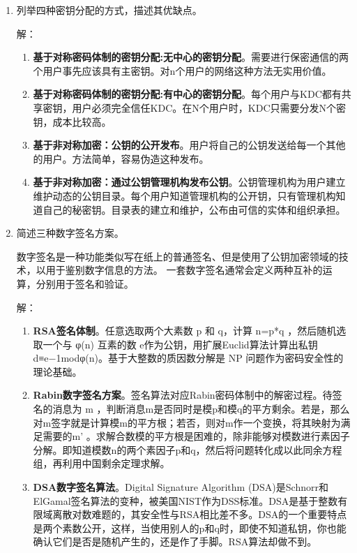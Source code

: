 \documentclass[degree=project,degree-type=project,cjk-font=noto]{thuthesis}
\begin{document}
\begin{enumerate}
\item 列举四种密钥分配的方式，描述其优缺点。

  {\heiti 解：}

\begin{enumerate}
  \item \textbf{基于对称密码体制的密钥分配:无中心的密钥分配}。需要进行保密通信的两个用户事先应该具有主密钥。对n个用户的网络这种方法无实用价值。
  \item \textbf{基于对称密码体制的密钥分配:有中心的密钥分配}。每个用户与KDC都有共享密钥，用户必须完全信任KDC。在N个用户时，KDC只需要分发N个密钥，成本比较高。
  \item \textbf{基于非对称加密：公钥的公开发布}。用户将自己的公钥发送给每一个其他的用户。方法简单，容易伪造这种发布。
  \item \textbf{基于非对称加密：通过公钥管理机构发布公钥}。公钥管理机构为用户建立维护动态的公钥目录。每个用户知道管理机构的公开钥，只有管理机构知道自己的秘密钥。目录表的建立和维护，公布由可信的实体和组织承担。
\end{enumerate}

\item 简述三种数字签名方案。

数字签名是一种功能类似写在纸上的普通签名、但是使用了公钥加密领域的技术，以用于鉴别数字信息的方法。
一套数字签名通常会定义两种互补的运算，分别用于签名和验证。

  {\heiti 解：}

\begin{enumerate}
  \item \textbf{RSA签名体制}。任意选取两个大素数 p 和 q，计算 n=p*q ，然后随机选取一个与 φ(n) 互素的数 e作为公钥，用扩展Euclid算法计算出私钥 d≡e−1modφ(n)。基于大整数的质因数分解是 NP 问题作为密码安全性的理论基础。
  \item \textbf{Rabin数字签名方案}。签名算法对应Rabin密码体制中的解密过程。待签名的消息为 m ，判断消息m是否同时是模p和模q的平方剩余。若是，那么对m签字就是计算模m的平方根；若否，则对m作一个变换，将其映射为满足需要的m’
。求解合数模的平方根是困难的，除非能够对模数进行素因子分解。即知道模数n的两个素因子p和q，然后将问题转化成以此同余方程组，再利用中国剩余定理求解。
  \item \textbf{DSA数字签名算法}。Digital Signature Algorithm (DSA)是Schnorr和ElGamal签名算法的变种，被美国NIST作为DSS标准。DSA是基于整数有限域离散对数难题的，其安全性与RSA相比差不多。DSA的一个重要特点是两个素数公开，这样，当使用别人的p和q时，即使不知道私钥，你也能确认它们是否是随机产生的，还是作了手脚。RSA算法却做不到。
\end{enumerate}


\end{enumerate}
\end{document}
